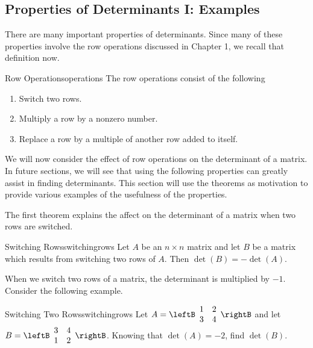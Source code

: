 \subsection{Properties of Determinants I: Examples}

There are many important properties of determinants. Since many of these properties involve
the row operations discussed in Chapter 1, we recall that definition now. 

\begin{definition}{Row Operations}{operations}
The row operations consist of the following

\begin{enumerate}
\item Switch two rows.

\item Multiply a row by a nonzero number.

\item Replace a row by a multiple of another row added to itself.
\end{enumerate}
\end{definition}

We will now consider the effect of row operations on the determinant of a matrix. In future sections, we will see that using the following properties can 
greatly assist in finding determinants. This section will use the theorems as motivation to provide various examples of the usefulness of the properties. 

The first theorem explains the affect on the determinant of a matrix when two rows are switched. 

\begin{theorem}{Switching Rows}{switchingrows}
Let $A$ be an $n\times n$ matrix and let $B$ be a matrix
which results from switching two rows of $A.$ Then $\det \left( B\right)
= - \det \left( A\right) .$ 
\end{theorem}

When we switch two rows of a matrix, the determinant is multiplied by $-1$. Consider the following example.

\begin{example}{Switching Two Rows}{switchingrows}
Let $A=\leftB
\begin{array}{rr}
1 & 2 \\
3 & 4
\end{array}
\rightB $ and let $B=\leftB
\begin{array}{rr}
3 & 4 \\
1 & 2
\end{array}
\rightB $. 
Knowing that $\det \left( A \right) =-2$, find $\det \left( B \right) $.
\end{example}

